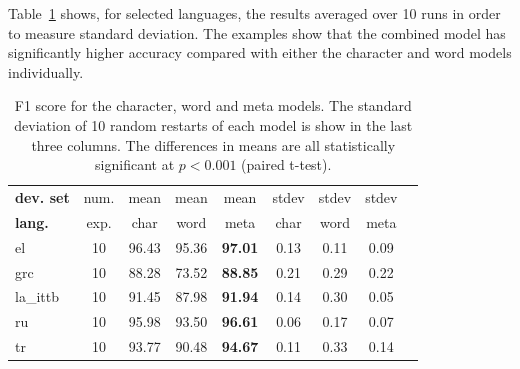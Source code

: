 \documentclass[11pt,a4paper]{article}
\begin{document}
Table~\ref{tab:ablation-charword} shows, for selected languages, the results averaged over 10 runs in order to measure standard deviation. The examples show that the combined model has significantly higher accuracy compared with either the character and word models individually. 

\begin{table}[t!]
\begin{center}
\small
\setlength{\tabcolsep}{3.5pt}
\begin{tabular}{|l|c|c|c|c||c|c|c|c}
\hline 
 \bf dev. set   & num.      & mean & mean & mean & stdev & stdev & stdev\\ 
 \bf lang.     & exp.      & char & word & meta & char & word  & meta  \\ 
\hline
el       & 10     & 96.43& 95.36&\bf 97.01& 0.13 &0.11 & 0.09\\
grc      & 10     & 88.28& 73.52&\bf88.85 & 0.21 &0.29 & 0.22\\
la\_ittb & 10     & 91.45& 87.98&\bf 91.94 & 0.14 &0.30 & 0.05\\
ru       & 10     & 95.98& 93.50&\bf 96.61& 0.06 &0.17 & 0.07\\
tr       & 10     & 93.77& 90.48&\bf 94.67& 0.11 &0.33 & 0.14\\
 \hline
\end{tabular}
\end{center}

\caption{F1 score for the character, word and meta models. The standard deviation of 10 random restarts of each model is show in the last three columns. The differences in means are all statistically significant at {$p<0.001$} (paired t-test). }
\label{tab:ablation-charword}
\end{table}
\end{document}
